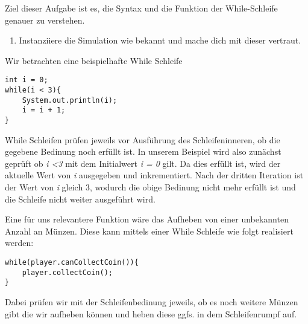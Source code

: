 
Ziel dieser Aufgabe ist es, die Syntax und die Funktion der While-Schleife genauer zu verstehen.
\begin{enumerate}[label=\alph*)]
    \item Instanziiere die Simulation wie bekannt und mache dich mit dieser vertraut.
\end{enumerate}

\begin{Infobox}
    Wir betrachten eine beispielhafte While Schleife
    \begin{lstlisting}[breaklines=true, numbers=none]
int i = 0;
while(i < 3){
    System.out.println(i);
    i = i + 1;
}
    \end{lstlisting}
    While Schleifen prüfen jeweils vor Ausführung des Schleifeninneren, ob die gegebene Bedinung noch erfüllt ist. In unserem Beispiel 
    wird also zunächst geprüft ob \textit{i \textless 3} mit dem Initialwert \textit{i = 0} gilt. Da dies erfüllt ist, wird der aktuelle Wert von \textit{i}
    ausgegeben und inkrementiert. Nach der dritten Iteration ist der Wert von \textit{i} gleich 3, wodurch die obige Bedinung nicht mehr erfüllt ist
    und die Schleife nicht weiter ausgeführt wird.\par 
    Eine für uns relevantere Funktion wäre das Aufheben von einer unbekannten Anzahl an Münzen. Diese kann mittels einer While Schleife wie folgt 
    realisiert werden:
    \begin{lstlisting}[breaklines=true, numbers=none]
while(player.canCollectCoin()){
    player.collectCoin();
}
    \end{lstlisting}
    Dabei prüfen wir mit der Schleifenbedinung
    jeweils, ob es noch weitere Münzen gibt die wir aufheben können und heben diese ggfs. in dem Schleifenrumpf auf.
\end{Infobox}

